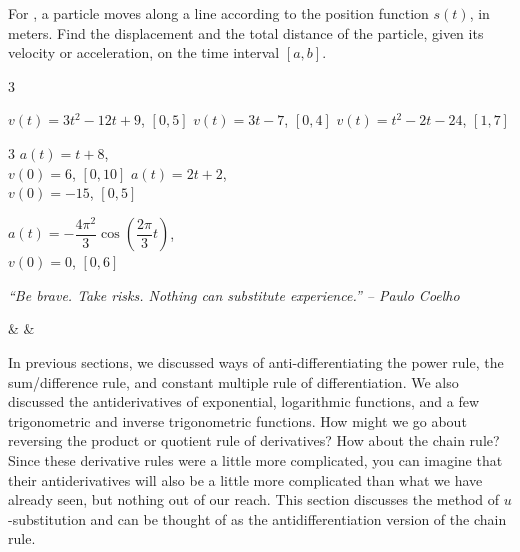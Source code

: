 \documentclass{book}
\begin{document}
For , a particle moves along a line according to the position function $s(t)$, in meters. Find the displacement and the total distance of the particle, given its velocity or acceleration, on the time interval $[a,b]$.
\begin{enumerate}[!HW!]
\begin{multicols}{3}
\item\label{exer:netchange:start} $v(t)=3t^2-12t+9$, $[0,5]$
\itemspade $v(t)=3t-7$, $[0,4]$ 
\itemspade $v(t)=t^2-2t-24$, $[1,7]$ 
\end{multicols}
\begin{multicols}{3}
\itemspade $a(t) = t+8$,\\\hfill $v(0) =6$, $[0,10]$ \columnbreak
\itemspade $a(t)=2t+2$,\\\hfill $v(0)=-15$, $[0,5]$ \columnbreak
\item\label{exer:netchange:stop} $a(t)=-\dfrac{4\pi^2}{3}\cos\left(\dfrac{2\pi}{3}t\right)$,\\\hfill $v(0)=0$, $[0,6]$ 
\end{multicols}
\end{enumerate}
\pagebreak

\begin{center} 
\emph{``Be brave. Take risks. Nothing can substitute experience.'' -- Paulo Coelho}
\end{center}

\begin{Videos}
 &
  &
\end{Videos}

In previous sections, we discussed ways of anti-differentiating the power rule, the sum/difference rule, and constant multiple rule of differentiation. We also discussed the antiderivatives of exponential, logarithmic functions, and a few trigonometric and inverse trigonometric functions. How might we go about reversing the product or quotient rule of derivatives? How about the chain rule? Since these derivative rules were a little more complicated, you can imagine that their antiderivatives will also be a little more complicated than what we have already seen, but nothing out of our reach. This section discusses the method of $u$-substitution and can be thought of as the antidifferentiation version of the chain rule.\\
\end{document}
